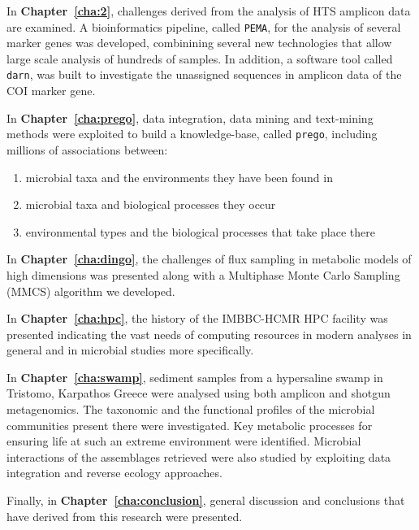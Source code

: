    In \textbf{Chapter~\ref{cha:2}}, challenges derived from the analysis of HTS amplicon data are examined.
   A bioinformatics pipeline, called \texttt{PEMA}, for the analysis of several marker genes was developed, combinining several new technologies that allow large scale analysis of hundreds of samples. 
   In addition, a software tool called \texttt{darn}, was built to investigate the unassigned sequences in amplicon data of the COI marker gene. 

   In \textbf{Chapter~\ref{cha:prego}}, data integration, data mining and text-mining methods were exploited to build a knowledge-base, called \texttt{prego}, including millions of associations between:
   \begin{enumerate}
      \item microbial taxa and the environments they have been found in 
      \item microbial taxa and biological processes they occur
      \item environmental types and the biological processes that take place there
   \end{enumerate}

   In \textbf{Chapter~\ref{cha:dingo}}, the challenges of flux sampling in metabolic models of high dimensions was presented along with a Multiphase Monte Carlo Sampling (MMCS) algorithm we developed. 

   In \textbf{Chapter~\ref{cha:hpc}}, the history of the IMBBC-HCMR HPC facility was presented indicating the vast needs of computing resources in modern analyses in general and in microbial studies more specifically. 

   In \textbf{Chapter~\ref{cha:swamp}}, sediment samples from a hypersaline swamp in Tristomo, Karpathos Greece were analysed using both amplicon and shotgun metagenomics. 
   The taxonomic and the functional profiles of the microbial communities present there were investigated. 
   Key metabolic processes for ensuring life at such an extreme environment were identified.
   Microbial interactions of the assemblages retrieved were also studied by exploiting 
   data integration and reverse ecology approaches.  


   Finally, in \textbf{Chapter~\ref{cha:conclusion}}, general discussion and conclusions that have derived from this research were presented. 





